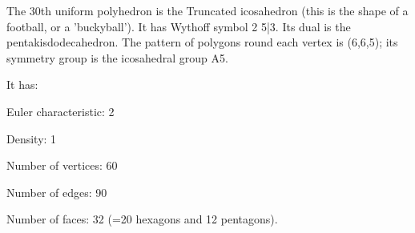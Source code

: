 The 30th uniform polyhedron is the Truncated icosahedron (this is the shape of a football, or a
'buckyball'). It has Wythoff symbol 2 5|3. Its dual is the pentakisdodecahedron. The pattern of polygons round each vertex is (6,6,5); its symmetry group is the icosahedral group A5.\par
It has:\par
Euler characteristic: 2\par
Density: 1\par
Number of vertices: 60\par
Number of edges:  90\par
Number of faces: 32 (=20 hexagons and 12 pentagons).